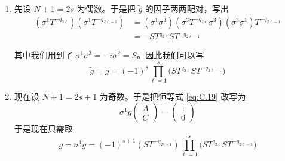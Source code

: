 \begin{enumerate}
  \item 先设 $N+1=2s$ 为偶数。于是把 $\tilde g$ 的因子两两配对，写出
  \begin{equation}
    \begin{aligned}
      (\sigma^1T^{-q_{2\ell}})(\sigma^1T^{-q_{2\ell-1}})&=(\sigma^1\sigma^3)(\sigma^3T^{-q_{2\ell}}\sigma^3)(\sigma^3\sigma^1)T^{-q_{2\ell-1}}\\
      &=-ST^{q_{2\ell}}ST^{-q_{2\ell-1}}
    \end{aligned}
    \tag{C.22}
    \label{eq:C.22}
  \end{equation}

  其中我们用到了 $\sigma^1\sigma^3=-i\sigma^2=S$。因此我们可以写
  \begin{equation}
    \tilde g=g=(-1)^s\prod_{\ell=1}^{s}\big(ST^{q_{2\ell}}ST^{-q_{2\ell-1}}\big)
    \tag{C.23}
    \label{eq:C.23}
  \end{equation}

  \item 现在设 $N+1=2s+1$ 为奇数。于是把恒等式 \eqref{eq:C.19} 改写为
  \begin{equation}
    \sigma^1\tilde g\begin{pmatrix}
      A\\
      C
    \end{pmatrix}=\begin{pmatrix}
      1\\
      0
    \end{pmatrix}
    \tag{C.24}
    \label{eq:C.24}
  \end{equation}
  于是现在只需取
  \begin{equation}
    g=\sigma^1\tilde g=(-1)^{s+1}(ST^{-q_{2s+1}})\prod_{\ell=1}^{s}\big(ST^{q_{2\ell}}ST^{-q_{2\ell-1}}\big)
    \tag{C.25}
    \label{eq:C.25}
  \end{equation}
\end{enumerate}

